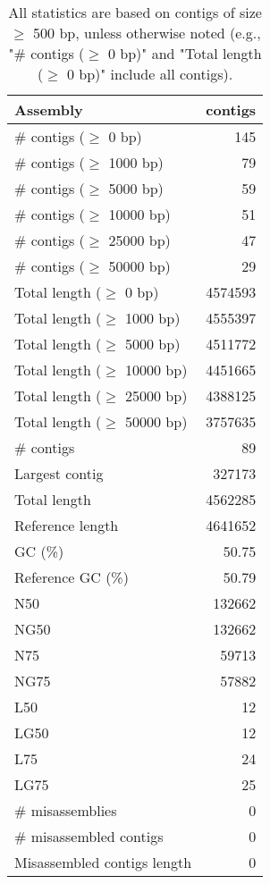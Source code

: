 \documentclass[12pt,a4paper]{article}
\begin{document}
\begin{table}[ht]
\begin{center}
\caption{All statistics are based on contigs of size $\geq$ 500 bp, unless otherwise noted (e.g., "\# contigs ($\geq$ 0 bp)" and "Total length ($\geq$ 0 bp)" include all contigs).}
\begin{tabular}{|l*{1}{|r}|}
\hline
Assembly & contigs \\ \hline
\# contigs ($\geq$ 0 bp) & 145 \\ \hline
\# contigs ($\geq$ 1000 bp) & 79 \\ \hline
\# contigs ($\geq$ 5000 bp) & 59 \\ \hline
\# contigs ($\geq$ 10000 bp) & 51 \\ \hline
\# contigs ($\geq$ 25000 bp) & 47 \\ \hline
\# contigs ($\geq$ 50000 bp) & 29 \\ \hline
Total length ($\geq$ 0 bp) & 4574593 \\ \hline
Total length ($\geq$ 1000 bp) & 4555397 \\ \hline
Total length ($\geq$ 5000 bp) & 4511772 \\ \hline
Total length ($\geq$ 10000 bp) & 4451665 \\ \hline
Total length ($\geq$ 25000 bp) & 4388125 \\ \hline
Total length ($\geq$ 50000 bp) & 3757635 \\ \hline
\# contigs & 89 \\ \hline
Largest contig & 327173 \\ \hline
Total length & 4562285 \\ \hline
Reference length & 4641652 \\ \hline
GC (\%) & 50.75 \\ \hline
Reference GC (\%) & 50.79 \\ \hline
N50 & 132662 \\ \hline
NG50 & 132662 \\ \hline
N75 & 59713 \\ \hline
NG75 & 57882 \\ \hline
L50 & 12 \\ \hline
LG50 & 12 \\ \hline
L75 & 24 \\ \hline
LG75 & 25 \\ \hline
\# misassemblies & 0 \\ \hline
\# misassembled contigs & 0 \\ \hline
Misassembled contigs length & 0 \\ \hline

\end{tabular}
\end{center}
\end{table}
\end{document}
